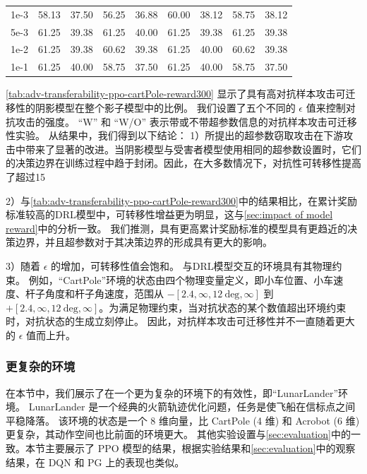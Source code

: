\begin{table}[!t]
{\begin{tabular}{c|cc|cc|cc|cc}
    1e-3 & 58.13 & 37.50             & 56.25 & 36.88              & 60.00    & 38.12             & 58.75 & 38.12                \\
    5e-3 & 61.25 & 39.38            & 61.25 & 40.00                 & 61.25 & 39.38             & 61.25 & 39.38                \\
    1e-2 & 61.25 & 39.38            & 60.62 & 39.38              & 61.25 & 40.00                & 60.62 & 39.38                \\
    1e-1 & 61.25 & 40.00               & 58.75 & 37.50               & 61.25 & 40.00                & 58.75 & 37.50                 \\
    \bottomrule
    \end{tabular}
    }
\end{table}

\autoref{tab:adv-transferability-ppo-cartPole-reward300} 显示了具有高对抗样本攻击可迁移性的阴影模型在整个影子模型中的比例。
我们设置了五个不同的 $\epsilon$ 值来控制对抗攻击的强度。
“W” 和 “W/O” 表示带或不带超参数信息的对抗样本攻击可迁移性实验。
从结果中，我们得到以下结论：
1）所提出的超参数窃取攻击在下游攻击中带来了显著的改进。当阴影模型与受害者模型使用相同的超参数设置时，它们的决策边界在训练过程中趋于封闭。因此，在大多数情况下，对抗性可转移性提高了超过15%

2）与\autoref{tab:adv-transferability-ppo-cartPole-reward300}中的结果相比，在累计奖励标准较高的DRL模型中，可转移性增益更为明显，这与\autoref{sec:impact of model reward}中的分析一致。
我们推测，具有更高累计奖励标准的模型具有更趋近的决策边界，并且超参数对于其决策边界的形成具有更大的影响。

3）随着 $\epsilon$ 的增加，可转移性值会饱和。
与DRL模型交互的环境具有其物理约束。
例如，“CartPole”环境的状态由四个物理变量定义，即小车位置、小车速度、杆子角度和杆子角速度，范围从 $-[2.4, \infty, 12~\text{deg}, \infty]$ 到 $+[2.4, \infty, 12~\text{deg}, \infty]$。为满足物理约束，当对抗状态的某个数值超出环境约束时，对抗状态的生成立刻停止。
因此，对抗样本攻击可迁移性并不一直随着更大的 $\epsilon$ 值而上升。

\subsubsection{更复杂的环境}
在本节中，我们展示了\sysname 在一个更为复杂的环境下的有效性，即“LunarLander”环境。 
LunarLander 是一个经典的火箭轨迹优化问题，任务是使飞船在信标点之间平稳降落。
该环境的状态是一个 8 维向量，比 CartPole (4 维) 和 Acrobot (6 维) 更复杂，其动作空间也比前面的环境更大。
其他实验设置与\autoref{sec:evaluation}中的一致。本节主要展示了 PPO 模型的结果，根据实验结果和\autoref{sec:evaluation}中的观察结果，\sysname 在 DQN 和 PG 上的表现也类似。

